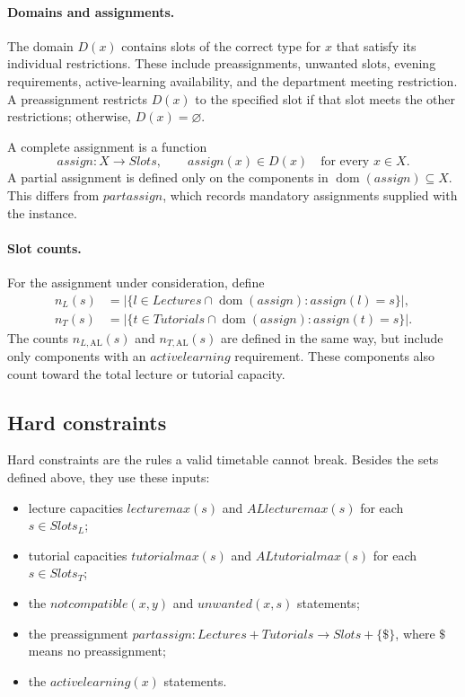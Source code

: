 \paragraph{Domains and assignments.}
The domain $D(x)$ contains slots of the correct type for
$x$ that satisfy its individual restrictions. These include
preassignments, unwanted slots, evening requirements,
active-learning availability, and the department meeting
restriction. A preassignment restricts $D(x)$ to the
specified slot if that slot meets the other restrictions;
otherwise, $D(x)=\varnothing$.

A complete assignment is a function
\[
\mathit{assign}:X\to\mathit{Slots},
\qquad
\mathit{assign}(x)\in D(x)\quad\text{for every }x\in X.
\]
A partial assignment is defined only on the components
in $\operatorname{dom}(\mathit{assign})\subseteq X$.
This differs from $\mathit{partassign}$, which records
mandatory assignments supplied with the instance.

\paragraph{Slot counts.}
For the assignment under consideration, define
\begin{align*}
n_L(s)
 &=|\{l\in\mathit{Lectures}\cap
       \operatorname{dom}(\mathit{assign}):
       \mathit{assign}(l)=s\}|,\\
n_T(s)
 &=|\{t\in\mathit{Tutorials}\cap
       \operatorname{dom}(\mathit{assign}):
       \mathit{assign}(t)=s\}|.
\end{align*}
The counts $n_{L,\mathrm{AL}}(s)$ and
$n_{T,\mathrm{AL}}(s)$ are defined in the same way, but
include only components with an $\mathit{activelearning}$
requirement. These components also count toward the total
lecture or tutorial capacity.

\subsection{Hard constraints}
\label{sec:hard}
Hard constraints are the rules a valid timetable cannot break. Besides the sets defined above, they use these inputs:
\begin{itemize}
  \item lecture capacities $\mathit{lecturemax}(s)$ and $\mathit{ALlecturemax}(s)$ for each $s \in \mathit{Slots}_L$;
  \item tutorial capacities $\mathit{tutorialmax}(s)$ and $\mathit{ALtutorialmax}(s)$ for each $s \in \mathit{Slots}_T$;
  \item the $\mathit{notcompatible}(x,y)$ and $\mathit{unwanted}(x,s)$ statements;
  \item the preassignment $\mathit{partassign} : \mathit{Lectures} + \mathit{Tutorials} \to \mathit{Slots} + \{\$\}$, where $\$$ means no preassignment;
  \item the $\mathit{activelearning}(x)$ statements.
\end{itemize}

